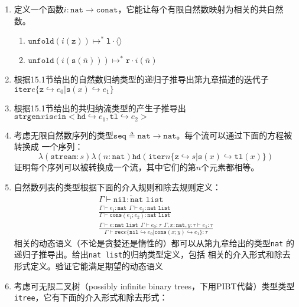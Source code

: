 \begin{enumerate}
	\item 定义一个函数$i:\texttt{nat}\rightarrow \texttt{conat}$，它能让每个有限自然数映射为相关的共自然数。
	\begin{enumerate}
		\renewcommand{\theenumi}{\alph{enumi}}
		\item $\texttt{unfold}(i(\texttt{z}))\mapsto^*\texttt{l}\cdot\langle\rangle$
		\item $\texttt{unfold}(i(\texttt{s}(\overline{n})))\mapsto^*\texttt{r}\cdot i(\overline{n})$
	\end{enumerate}
	\item 根据15.1节给出的自然数归纳类型的递归子推导出第九章描述的迭代子
	$\texttt{iter} e\{\texttt{z}\hookrightarrow e_0|\texttt{s}(x)\hookrightarrow e_1\}$
	\item 根据15.1节给出的共归纳流类型的产生子推导出$\texttt{strgen}x\texttt{is} e\texttt{in}
	<\texttt{hd}\hookrightarrow e_1, \texttt{tl}\hookrightarrow e_2>$
	\item 考虑无限自然数序列的类型$\texttt{seq}\triangleq\texttt{nat}\rightarrow\texttt{nat}$。每个流可以通过下面的方程被转换成
	一个序列：$$\lambda(\texttt{stream}:s)\lambda(n:\texttt{nat})\texttt{hd}(\texttt{iter} n
	\{\texttt{z}\hookrightarrow s|\texttt{s}(x)\hookrightarrow\texttt{tl}(x)\})$$
	证明每个序列可以被转换成一个流，其中它们的第$n$个元素都相等。
	\item 自然数列表的类型根据下面的介入规则和除去规则定义：
	\begin{subequations}
		\begin{gather}
		\overline{\Gamma\vdash\texttt{nil}:\texttt{nat list}} \\
		\frac{\Gamma\vdash e_1:\texttt{nat}\ \ \Gamma\vdash e_2:\texttt{nat list}}
		{\Gamma\vdash\texttt{cons}(e_1;e_2):\texttt{nat list}} \\
		\frac{\Gamma\vdash e:\texttt{nat list}\ \ \Gamma\vdash e_0:\tau\ \ \Gamma,x:\texttt{nat},y:\tau\vdash e_1:\tau}
		{\Gamma\vdash\texttt{rec} e\{\texttt{nil}\hookrightarrow e_0|\texttt{cons}(x;y)\hookrightarrow e_1\}:\tau}
		\end{gather}
	\end{subequations}
	相关的动态语义（不论是贪婪还是惰性的）都可以从第九章给出的类型\texttt{nat} 的递归子推导出。给出\texttt{nat list}的归纳类型定义，包括
	相关的介入形式和除去形式定义。验证它能满足期望的动态语义
	\item 考虑可无限二叉树（possibly infinite binary trees，下用PIBT代替）类型类型\texttt{itree}，它有下面的介入形式和除去形式：
	\begin{subequations}

\end{subequations}
\end{enumerate}
